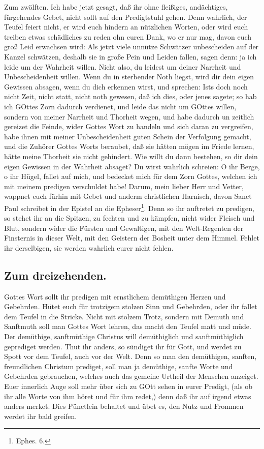 Zum zwölften. Ich habe jetzt gesagt, daß ihr ohne fleißiges, andächtiges, fürgehendes Gebet, nicht sollt auf den Predigtstuhl gehen. Denn wahrlich, der Teufel feiert nicht, er wird euch hindern an nützlichen Worten, oder wird euch treiben etwas schädliches zu reden ohn euren Dank, wo er nur mag, davon euch groß Leid erwachsen wird: Als jetzt viele unnütze Schwätzer unbescheiden auf der Kanzel schwätzen, deshalb sie in große Pein und Leiden fallen, sagen denn: ja ich leide um der Wahrheit willen. Nicht also, du leidest um deiner Narrheit und Unbescheidenheit willen. Wenn du in sterbender Noth liegst, wird dir dein eigen Gewissen absagen, wenn du dich erkennen wirst, und sprechen: Ists doch noch nicht Zeit, nicht statt, nicht noth gewesen, daß ich dies, oder jenes sagete; so hab ich GOttes Zorn dadurch verdienet, und leide das nicht um GOttes willen, sondern von meiner Narrheit und Thorheit wegen, und habe dadurch un%
zeitlich gereizet die Feinde, wider Gottes Wort zu handeln und sich daran zu vergreifen, habe ihnen mit meiner Unbescheidenheit guten Schein der Verfolgung gemacht, und die Zuhörer Gottes Worts beraubet, daß sie hätten mögen im Friede lernen, hätte meine Thorheit sie nicht gehindert. Wie willt du dann bestehen, so dir dein eigen Gewissen in der Wahrheit absaget? Du wirst wahrlich schreien: O ihr Berge, o ihr Hügel, fallet auf mich, und bedecket mich für dem Zorn Gottes, welchen ich mit meinem predigen verschuldet habe! Darum, mein lieber Herr und Vetter, wappnet euch fürhin mit Gebet und anderm christlichen Harnisch, davon Sanct Paul schreibet in der Epistel an die Epheser\footnote{Ephes. 6.}. Denn so ihr auftretet zu predigen, so stehet ihr an die Spitzen, zu fechten und zu kämpfen, nicht wider Fleisch und Blut, sondern wider die Fürsten und Gewaltigen, mit den Welt-Regenten der Finsternis in dieser Welt, mit den Geistern der Bosheit unter dem Himmel. Fehlet ihr derselbigen, sie werden wahrlich eurer nicht fehlen.

\subsection*{Zum dreizehenden.}
%

Gottes Wort sollt ihr predigen mit ernstlichem demüthigen Herzen und Gebehrden. Hütet euch für trotzigem stolzen Sinn und Gebehrden, oder ihr fallet dem Teufel in die Stricke. Nicht mit stolzem Trotz, sondern mit Demuth und Sanftmuth soll man Gottes Wort lehren, das macht den Teufel matt und müde. Der demüthige, sanftmüthige Christus will demüthiglich und sanftmüthiglich geprediget werden. Thut ihr anders, so sündiget ihr für Gott, und werdet zu Spott vor dem Teufel, auch vor der Welt. Denn so man den demüthigen, sanften, freundlichen Christum prediget, soll man ja demüthige, sanfte Worte und Gebehrden gebrauchen, welches auch das gemeine Urtheil der Menschen anzeiget. Euer innerlich
Auge soll mehr über sich zu GOtt sehen in eurer Predigt, (als ob ihr alle Worte von ihm höret und für ihm redet,) denn daß ihr auf irgend etwas anders merket. Dies Pünctlein behaltet und übet es, den Nutz und Frommen werdet ihr bald greifen.

